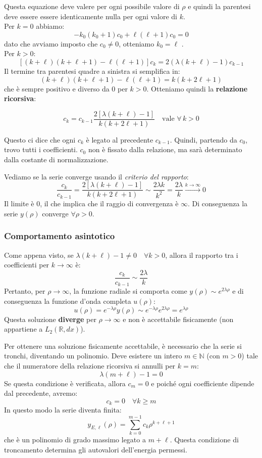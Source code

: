 Questa equazione deve valere per ogni possibile valore di \(\rho\) e quindi la parentesi deve essere essere identicamente nulla per ogni valore di \(k\).\\
Per \(k=0\) abbiamo:
\[
-k_0(k_0+1)c_0 + \ell(\ell+1)c_0 = 0
\]
dato che avviamo imposto che \(c_0 \neq 0\), otteniamo \(k_0 = \ell\) .\\
Per \( k > 0 \):
\[
\left[ (k+\ell)(k+\ell+1) - \ell(\ell+1) \right] c_k = 2 \left( \lambda(k+\ell) - 1 \right) c_{k-1}
\]
Il termine tra parentesi quadre a sinistra si semplifica in:
\[
(k+\ell)(k+\ell+1) - \ell(\ell+1) = k(k+2\ell+1)
\]
che è sempre positivo e diverso da 0 per \( k>0 \). Otteniamo quindi la \textbf{relazione ricorsiva}:

\begin{equation}
    c_k = c_{k-1} \frac{2[\lambda(k+\ell)-1]}{k(k+2\ell+1)} \quad \text{vale } \forall \,k > 0    
\end{equation}

Questo ci dice che ogni \( c_k \) è legato al precedente \( c_{k-1} \). Quindi, partendo da \( c_0 \), trovo tutti i coefficienti. \( c_0 \) non è fissato dalla relazione, ma sarà determinato dalla costante di normalizzazione.

Vediamo se la serie converge usando il \textit{criterio del rapporto}:
\[
\frac{c_k}{c_{k-1}} = \frac{2[\lambda(k+\ell)-1]}{k(k+2\ell+1)} \sim \frac{2\lambda k}{k^2} = \frac{2\lambda}{k} \xrightarrow{k \to \infty} 0
\]
Il limite è \( 0 \), il che implica che il raggio di convergenza è \( \infty \). Di conseguenza la serie \( y(\rho) \) converge \( \forall \rho > 0 \).

\subsubsection{Comportamento asintotico}
Come appena visto, se \( \lambda(k+\ell)-1 \neq 0 \quad \forall k > 0 \), allora il rapporto tra i coefficienti per \( k \to \infty \) è:
\[
\frac{c_k}{c_{k-1}} \sim \frac{2\lambda}{k}
\]
Pertanto, per \( \rho \to \infty \), la funzione radiale si comporta come
\(
y(\rho) \sim e^{2\lambda\rho}
\)
e di conseguenza la funzione d'onda completa \( u(\rho) \):
\[
u(\rho) = e^{-\lambda\rho}y(\rho) \sim e^{-\lambda\rho} e^{2\lambda\rho} = e^{\lambda\rho}
\]
Questa soluzione \textbf{diverge} per \( \rho \to \infty \) e non è accettabile fisicamente (non appartiene a \( L_2(\mathbb{R}, dx) \)).

Per ottenere una soluzione fisicamente accettabile, è necessario che la serie si tronchi, diventando un polinomio.
Deve esistere un intero \( m \in \mathbb{N} \) (con \( m > 0 \)) tale che il numeratore della relazione ricorsiva si annulli per \( k=m \):
\[
\lambda(m+\ell) - 1 = 0
\]
Se questa condizione è verificata, allora \( c_m = 0 \) e poiché ogni coefficiente dipende dal precedente, avremo:
\[
c_k = 0 \quad \forall k \ge m
\]
In questo modo la serie diventa finita:
\begin{equation}
    y_{E,\ell}(\rho) = \sum_{k=0}^{m-1} c_k \rho^{k+\ell+1}
\end{equation}
che è un polinomio di grado massimo legato a \( m+\ell \). Questa condizione di troncamento determina gli autovalori dell'energia permessi.

